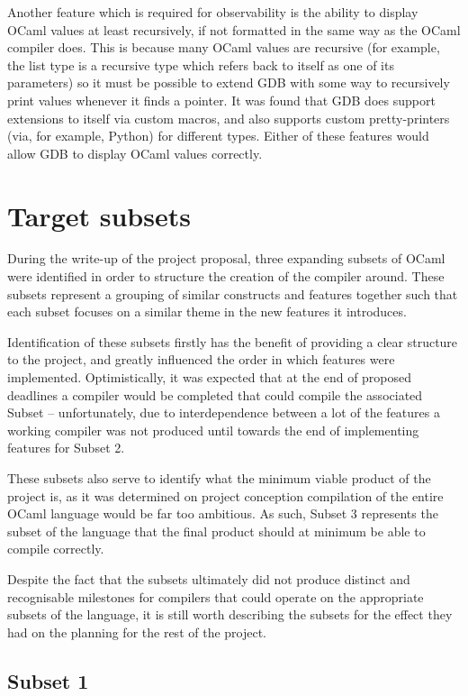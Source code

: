 \documentclass[12pt,a4paper,twoside,openright]{report}
\begin{document}
Another feature which is required for observability is the ability to display 
OCaml values at least recursively, if not formatted in the same way as the 
OCaml compiler does. This is because many OCaml values are recursive (for 
example, the list type is a recursive type which refers back to itself as one 
of its parameters) so it must be possible to extend GDB with some way to 
recursively print values whenever it finds a pointer. It was found that GDB 
does support extensions to itself via custom macros, and also supports custom 
pretty-printers (via, for example, Python) for different types. Either of these 
features would allow GDB to display OCaml values correctly.

\section{Target subsets}

During the write-up of the project proposal, three expanding subsets of OCaml 
were identified in order to structure the creation of the compiler around. 
These subsets represent a grouping of similar constructs and features together 
such that each subset focuses on a similar theme in the new features it 
introduces.

Identification of these subsets firstly has the benefit of providing a clear 
structure to the project, and greatly influenced the order in which features 
were implemented. Optimistically, it was expected that at the end of proposed 
deadlines a compiler would be completed that could compile the associated 
Subset -- unfortunately, due to interdependence between a lot of the features a 
working compiler was not produced until towards the end of implementing 
features for Subset 2.

These subsets also serve to identify what the minimum viable product of the 
project is, as it was determined on project conception compilation of the 
entire OCaml language would be far too ambitious. As such, Subset 3 represents 
the subset of the language that the final product should at minimum be able to 
compile correctly.

Despite the fact that the subsets ultimately did not produce distinct and 
recognisable milestones for compilers that could operate on the appropriate 
subsets of the language, it is still worth describing the subsets for the 
effect they had on the planning for the rest of the project.

\subsection{Subset 1}
\end{document}

